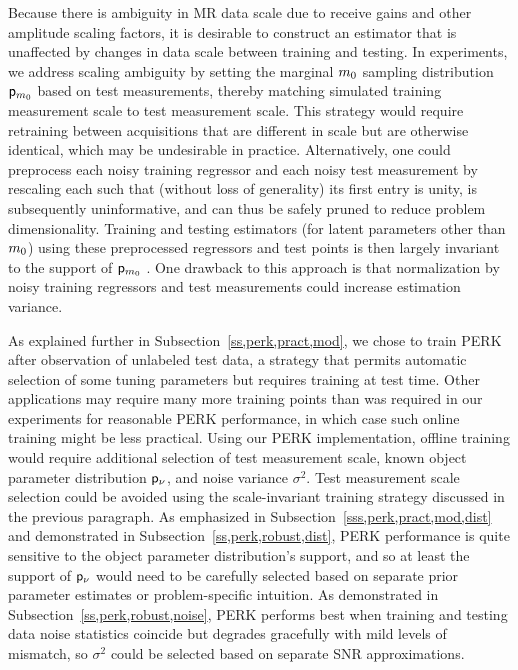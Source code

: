 Because there is ambiguity
in MR data scale
due to receive gains
and other amplitude scaling factors,
it is desirable
to construct an estimator
that is unaffected
by changes in data scale
between training and testing.
In experiments,
we address scaling ambiguity
by setting the marginal $m_0$ sampling distribution $\mathsf{p}_{m_0}$
based on test measurements,
thereby matching simulated training measurement scale
to test measurement scale.
This strategy would require retraining between acquisitions
that are different in scale 
but are otherwise identical,
which may be undesirable in practice.
Alternatively,
one could preprocess 
each noisy training regressor
and each noisy test measurement
by rescaling each such that 
(without loss of generality) 
its first entry is unity,
is subsequently uninformative,
and can thus be safely pruned
to reduce problem dimensionality.
Training and testing estimators
(for latent parameters other than $m_0$)
using these preprocessed regressors and test points
is then largely invariant
to the support 
of $\mathsf{p}_{m_0}$ \cite{nataraj:17:slw}.
One drawback 
to this approach
is that normalization
by noisy training regressors and test measurements
could increase estimation variance.

As explained further 
in Subsection~\ref{ss,perk,pract,mod},
we chose to train PERK
after observation of unlabeled test data,
a strategy that permits automatic selection
of some tuning parameters
but requires training at test time.
Other applications may require
many more training points 
than was required in our experiments
for reasonable PERK performance,
in which case such online training
might be less practical.
Using our PERK implementation,
offline training would require additional selection
of test measurement scale,
known object parameter distribution $\mathsf{p}_{\nu}$,
and noise variance $\sigma^2$.
Test measurement scale selection
could be avoided 
using the scale-invariant training strategy
discussed in the previous paragraph.
As emphasized 
in Subsection~\ref{sss,perk,pract,mod,dist}
and demonstrated 
in Subsection~\ref{ss,perk,robust,dist},
PERK performance is quite sensitive
to the object parameter distribution's support,
and so at least the support of $\mathsf{p}_{\nu}$
would need to be carefully selected
based on separate prior parameter estimates
or problem-specific intuition.
As demonstrated 
in Subsection~\ref{ss,perk,robust,noise},
PERK performs best 
when training and testing data noise statistics coincide
but degrades gracefully 
with mild levels of mismatch,
so $\sigma^2$ could be selected
based on separate SNR approximations.

